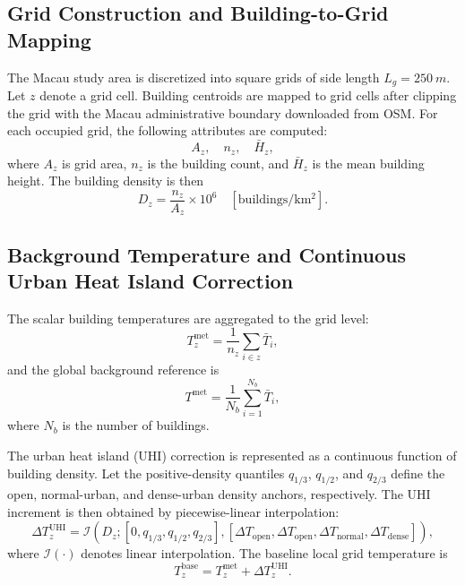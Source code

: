 \documentclass[conference]{IEEEtran}
\begin{document}
\subsection{Grid Construction and Building-to-Grid Mapping}
The Macau study area is discretized into square grids of side length $L_g=\SI{250}{m}$. Let $z$ denote a grid cell. Building centroids are mapped to grid cells after clipping the grid with the Macau administrative boundary downloaded from OSM. For each occupied grid, the following attributes are computed:
\begin{equation}
    A_z, \quad n_z, \quad \bar{H}_z,
\end{equation}
where $A_z$ is grid area, $n_z$ is the building count, and $\bar{H}_z$ is the mean building height. The building density is then
\begin{equation}
    D_z = \frac{n_z}{A_z}\times 10^6 \quad [\mathrm{buildings/km^2}].
\end{equation}

\subsection{Background Temperature and Continuous Urban Heat Island Correction}
The scalar building temperatures are aggregated to the grid level:
\begin{equation}
    T^{\mathrm{met}}_z = \frac{1}{n_z}\sum_{i \in z} \bar{T}_i,
\end{equation}
and the global background reference is
\begin{equation}
    T^{\mathrm{met}} = \frac{1}{N_b}\sum_{i=1}^{N_b} \bar{T}_i,
\end{equation}
where $N_b$ is the number of buildings.

The urban heat island (UHI) correction is represented as a continuous function of building density. Let the positive-density quantiles $q_{1/3}$, $q_{1/2}$, and $q_{2/3}$ define the open, normal-urban, and dense-urban density anchors, respectively. The UHI increment is then obtained by piecewise-linear interpolation:
\begin{equation}
    \Delta T^{\mathrm{UHI}}_z =
    \mathcal{I}\left(
    D_z;
    \left[0, q_{1/3}, q_{1/2}, q_{2/3}\right],
    \left[\Delta T_{\mathrm{open}}, \Delta T_{\mathrm{open}}, \Delta T_{\mathrm{normal}}, \Delta T_{\mathrm{dense}}\right]
    \right),
\end{equation}
where $\mathcal{I}(\cdot)$ denotes linear interpolation. The baseline local grid temperature is
\begin{equation}
    T^{\mathrm{base}}_z = T^{\mathrm{met}}_z + \Delta T^{\mathrm{UHI}}_z.
\end{equation}
\end{document}
